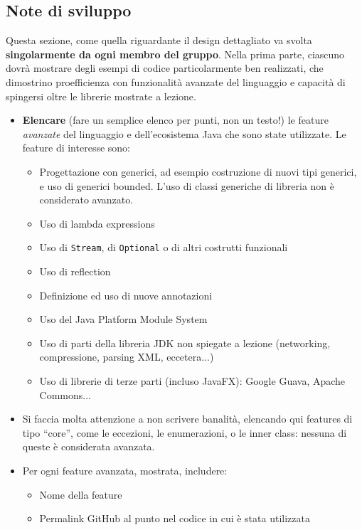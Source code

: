 \documentclass[a4paper,12pt]{report}
\begin{document}
\begin{itemize}
\section{Note di sviluppo}

Questa sezione, come quella riguardante il design dettagliato va svolta \textbf{singolarmente da ogni membro del gruppo}.
%
Nella prima parte, ciascuno dovrà mostrare degli esempi di codice particolarmente ben realizzati,
che dimostrino proefficienza con funzionalità avanzate del linguaggio e capacità di spingersi oltre le librerie mostrate a lezione.

\begin{itemize}
	\item \textbf{Elencare} (fare un semplice elenco per punti, non un testo!) le feature \textit{avanzate} del linguaggio e dell'ecosistema Java che sono state
utilizzate. Le feature di interesse sono:
	\begin{itemize}
		\item Progettazione con generici, ad esempio costruzione di nuovi tipi generici, e uso di generici bounded.
		L'uso di classi generiche di libreria non è considerato avanzato.
		\item Uso di lambda expressions
		\item Uso di \texttt{Stream}, di \texttt{Optional} o di altri costrutti funzionali
		\item Uso di reflection
		\item Definizione ed uso di nuove annotazioni
		\item Uso del Java Platform Module System
		\item Uso di parti della libreria JDK non spiegate a lezione (networking, compressione, parsing XML, eccetera...)
		\item Uso di librerie di terze parti (incluso JavaFX): Google Guava, Apache Commons...
	\end{itemize}
	\item Si faccia molta attenzione a non scrivere banalità, elencando qui features di tipo ``core'', come le eccezioni, le enumerazioni, o le inner class: nessuna di queste è considerata avanzata.
	\item Per ogni feature avanzata, mostrata, includere:
	\begin{itemize}
		\item Nome della feature
		\item Permalink GitHub al punto nel codice in cui è stata utilizzata
	\end{itemize}
\end{itemize}


\end{itemize}
\end{document}
